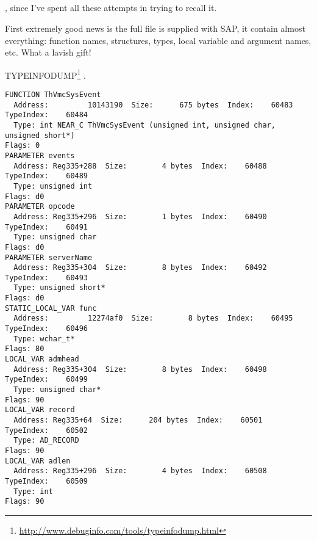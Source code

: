 \subsection{}

, 
{since I've spent all these attempts in trying to recall it}.

{First extremely good news is the full  file is supplied with SAP, it contain almost everything: function names, structures, types, local variable and argument names, etc. What a lavish gift!}

 TYPEINFODUMP\footnote{\url{http://www.debuginfo.com/tools/typeinfodump.html}} .


\begin{lstlisting}
FUNCTION ThVmcSysEvent 
  Address:         10143190  Size:      675 bytes  Index:    60483  TypeIndex:    60484 
  Type: int NEAR_C ThVmcSysEvent (unsigned int, unsigned char, unsigned short*)
Flags: 0 
PARAMETER events 
  Address: Reg335+288  Size:        4 bytes  Index:    60488  TypeIndex:    60489 
  Type: unsigned int
Flags: d0 
PARAMETER opcode 
  Address: Reg335+296  Size:        1 bytes  Index:    60490  TypeIndex:    60491 
  Type: unsigned char
Flags: d0 
PARAMETER serverName 
  Address: Reg335+304  Size:        8 bytes  Index:    60492  TypeIndex:    60493 
  Type: unsigned short*
Flags: d0 
STATIC_LOCAL_VAR func 
  Address:         12274af0  Size:        8 bytes  Index:    60495  TypeIndex:    60496 
  Type: wchar_t*
Flags: 80 
LOCAL_VAR admhead 
  Address: Reg335+304  Size:        8 bytes  Index:    60498  TypeIndex:    60499 
  Type: unsigned char*
Flags: 90 
LOCAL_VAR record 
  Address: Reg335+64  Size:      204 bytes  Index:    60501  TypeIndex:    60502 
  Type: AD_RECORD
Flags: 90 
LOCAL_VAR adlen 
  Address: Reg335+296  Size:        4 bytes  Index:    60508  TypeIndex:    60509 
  Type: int
Flags: 90 
\end{lstlisting}

